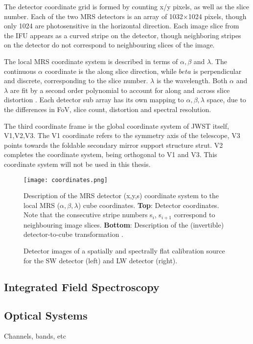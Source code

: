 The detector coordinate grid is formed by counting x/y pixels, as well as the slice number.
Each of the two MRS detectors is an array of 1032$\times$1024 pixels, though only 1024 are photosensitive in the horizontal direction.
Each image slice from the IFU appears as a curved stripe on the detector, though neighboring stripes on the detector do not correspond to neighbouring slices of the image. 

The local MRS coordinate system is described in terms of $\alpha,\beta$ and $\lambda$. The continuous $\alpha$ coordinate is the along slice direction, while $beta$ is perpendicular and discrete, corresponding to the slice number. $\lambda$ is the wavelength. Both $\alpha$ and $\lambda$ are fit by a second order polynomial to account for along and across slice distortion \parencite{MIRI6}. Each detector sub array has its own mapping to $\alpha,\beta,\lambda$ space, due to the differences in FoV, slice count, distortion and spectral resolution.

The third coordinate frame is the global coordinate system of JWST itself, V1,V2,V3. The V1 coordinate refers to the symmetry axis of the telescope, V3 points towards the foldable secondary mirror support structure strut. V2 completes the coordinate system, being orthogonal to V1 and V3. This coordinate system will not be used in this thesis.

\begin{figure}[t]
	\texttt{[image: coordinates.png]}
	\caption{Description of the MRS detector (x,y,s) coordinate system to the local MRS ($\alpha,\beta,\lambda$) cube coordinates. \textbf{Top}: Detector coordinates. Note that the consecutive stripe numbers s$_{i}$, s$_{i+1}$ correspond to neighbouring image slices. \textbf{Bottom}: Description of the (invertible) detector-to-cube transformation \parencite{Argyriou2020}.}
	\label{fig:mrscoords}	
\end{figure}

\begin{figure}[t]
	\caption{Detector images of a spatially and spectrally flat calibration source for the SW detector (left) and LW detector (right).}
	\label{fig:flatfield}
\end{figure}
\subsection{Integrated Field Spectroscopy}
\subsection{Optical Systems}
Channels, bands, etc \cite{ref:Chen2019}
